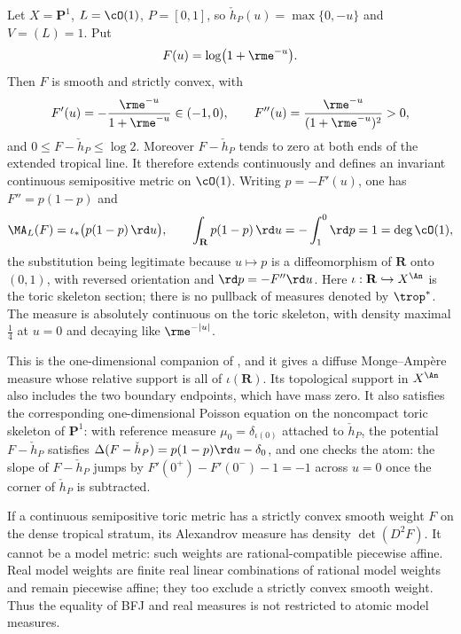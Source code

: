 \begin{example}
\label{ex:ch31-toric-logistic}
Let $X=\mathbf P^1$, $L=\cO(1)$, $P=[0,1]$, so
$\check h_P(u)=\max\{0,-u\}$ and $V=(L)=1$.  Put
\[
 F(u)=\log\bigl(1+\rme^{-u}\bigr).
\]
Then $F$ is smooth and strictly convex, with
\[
 F'(u)=-\frac{\rme^{-u}}{1+\rme^{-u}}\in(-1,0),
 \qquad
 F''(u)=\frac{\rme^{-u}}{(1+\rme^{-u})^2}>0,
\]
and $0\leq F-\check h_P\leq\log2$.  Moreover $F-\check h_P$ tends to
zero at both ends of the extended tropical line.  It therefore extends
continuously and defines an invariant continuous semipositive metric on
$\cO(1)$.  Writing $p=-F'(u)$, one has
$F''=p(1-p)$ and
\begin{equation}
\label{eq:ch31-logistic-measure}
 \MA_L(F)=\iota_*\bigl(p(1-p)\,\rd u\bigr),
 \qquad
 \int_{\mathbf R}p(1-p)\,\rd u
  =-\int_1^0\rd p=1=\deg\cO(1),
\end{equation}
the substitution being legitimate because $u\mapsto p$ is a
diffeomorphism of $\mathbf R$ onto $(0,1)$, with reversed orientation
and $\rd p=-F''\rd u$.  Here
$\iota:\mathbf R\hookrightarrow X^{\An}$ is the toric skeleton section;
there is no pullback of measures denoted by $\trop^*$.
The measure is absolutely continuous on the toric skeleton, with density
maximal $\tfrac14$ at $u=0$ and decaying like $\rme^{-|u|}$.

This is the one-dimensional companion of , and
it gives a diffuse Monge--Amp\`ere measure whose relative support is all
of $\iota(\mathbf R)$.  Its topological support in $X^{\An}$ also includes
the two boundary endpoints, which have mass zero.  It also
satisfies the corresponding one-dimensional Poisson equation on the
noncompact toric skeleton of $\mathbf P^1$: with reference measure
$\mu_0=\delta_{\iota(0)}$ attached to $\check h_P$, the potential
$F-\check h_P$ satisfies $\Delta(F-\check h_P)=p(1-p)\rd u-\delta_0$, and
one checks the atom: the slope of $F-\check h_P$ jumps by
$F'(0^+)-F'(0^-)-1=-1$ across $u=0$ once the corner of
$\check h_P$ is subtracted.
\end{example}

\begin{example}
\label{ex:ch31-toric-smooth-not-model}
If a continuous semipositive toric metric has a strictly convex smooth
weight $F$ on the dense tropical stratum, its Alexandrov measure has
density $\det(D^2F)$.  It cannot be a model metric: such weights are
rational-compatible piecewise affine.  Real model weights are finite real
linear combinations of rational model weights and remain piecewise affine;
they too exclude a strictly convex smooth weight.  Thus the equality of BFJ and real measures is
not restricted to atomic model measures.
\end{example}

